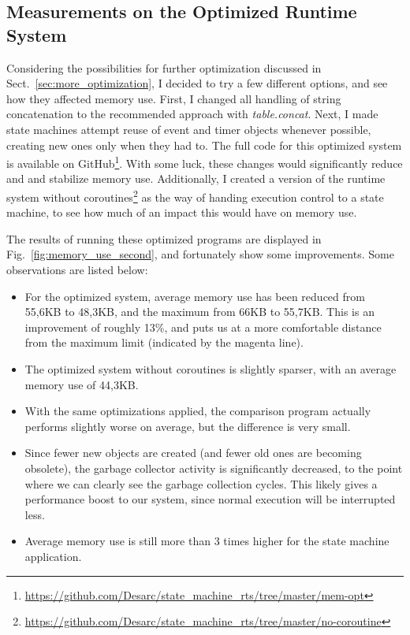 \subsection{Measurements on the Optimized Runtime System}
\label{sec:opt_rts}
Considering the possibilities for further optimization discussed in Sect.~\ref{sec:more_optimization}, I decided to try a few different options, and see how they affected memory use. First, I changed all handling of string concatenation to the recommended approach with \emph{table.concat}. Next, I made state machines attempt reuse of event and timer objects whenever possible, creating new ones only when they had to. The full code for this optimized system is available on GitHub\footnote{\url{https://github.com/Desarc/state_machine_rts/tree/master/mem-opt}}. With some luck, these changes would significantly reduce and and stabilize memory use. Additionally, I created a version of the runtime system without coroutines\footnote{\url{https://github.com/Desarc/state_machine_rts/tree/master/no-coroutine}} as the way of handing execution control to a state machine, to see how much of an impact this would have on memory use.

The results of running these optimized programs are displayed in Fig.~\ref{fig:memory_use_second}, and fortunately show some improvements. Some observations are listed below:

\begin{itemize}
	\item For the optimized system, average memory use has been reduced from 55,6KB to 48,3KB, and the maximum from 66KB to 55,7KB. This is an improvement of roughly 13\%, and puts us at a more comfortable distance from the maximum limit (indicated by the magenta line).
	\item The optimized system without coroutines is slightly sparser, with an average memory use of 44,3KB.
	\item With the same optimizations applied, the comparison program actually performs slightly worse on average, but the difference is very small.
	\item Since fewer new objects are created (and fewer old ones are becoming obsolete), the garbage collector activity is significantly decreased, to the point where we can clearly see the garbage collection cycles. This likely gives a performance boost to our system, since normal execution will be interrupted less.
	\item Average memory use is still more than 3 times higher for the state machine application.
\end{itemize}


